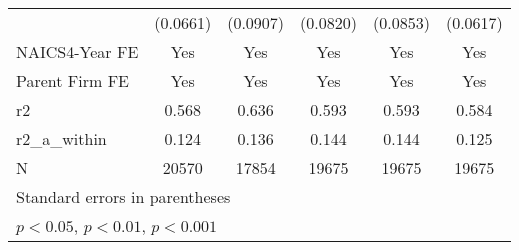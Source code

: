 {\begin{tabular}{l*{5}{c}}
            &    (0.0661)         &    (0.0907)         &    (0.0820)         &    (0.0853)         &    (0.0617)         \\
[1em]
NAICS4-Year FE&         Yes         &         Yes         &         Yes         &         Yes         &         Yes         \\
[1em]
Parent Firm FE&         Yes         &         Yes         &         Yes         &         Yes         &         Yes         \\
\hline
r2          &       0.568         &       0.636         &       0.593         &       0.593         &       0.584         \\
r2\_a\_within &       0.124         &       0.136         &       0.144         &       0.144         &       0.125         \\
N           &       20570         &       17854         &       19675         &       19675         &       19675         \\
\hline\hline
\multicolumn{6}{l}{\footnotesize Standard errors in parentheses}\\
\multicolumn{6}{l}{\footnotesize \sym{*} \(p<0.05\), \sym{**} \(p<0.01\), \sym{***} \(p<0.001\)}\\
\end{tabular}
}

